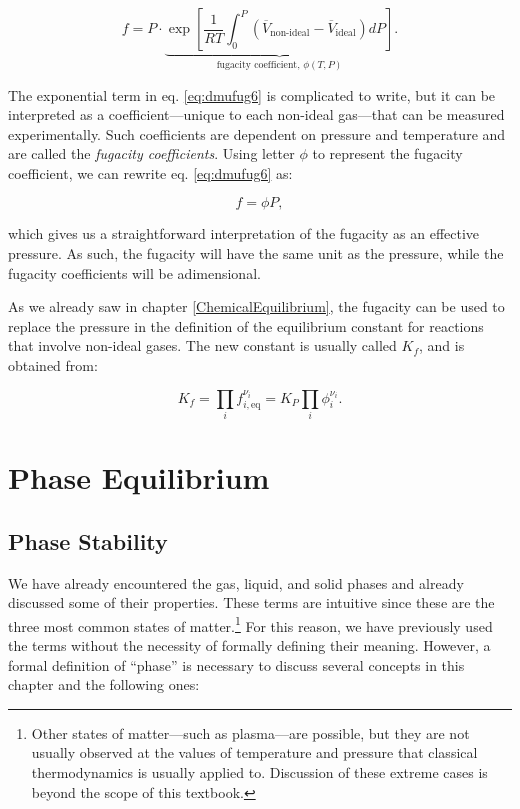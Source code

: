 \documentclass[
  9pt,
]{extbook}
\theoremstyle{definition}
\theoremstyle{definition}
\theoremstyle{definition}
\theoremstyle{remark}
\begin{document}
\begin{equation}
f = P \cdot \underbrace{\exp\left[ \frac{1}{RT} \int_0^P \left(\overline{V}_{\text{non-ideal}}-\overline{V}_{\text{ideal}} \right) dP \right]}_{\text{fugacity coefficient, }\phi(T,P)}.
\label{eq:dmufug6}
\end{equation}

The exponential term in eq. \eqref{eq:dmufug6} is complicated to write, but it can be interpreted as a coefficient---unique to each non-ideal gas---that can be measured experimentally. Such coefficients are dependent on pressure and temperature and are called the \emph{fugacity coefficients}. Using letter \(\phi\) to represent the fugacity coefficient, we can rewrite eq. \eqref{eq:dmufug6} as:

\begin{equation}
f = \phi P,
\label{eq:dmufug7}
\end{equation}

which gives us a straightforward interpretation of the fugacity as an effective pressure. As such, the fugacity will have the same unit as the pressure, while the fugacity coefficients will be adimensional.

As we already saw in chapter \ref{ChemicalEquilibrium}, the fugacity can be used to replace the pressure in the definition of the equilibrium constant for reactions that involve non-ideal gases. The new constant is usually called \(K_f\), and is obtained from:

\begin{equation}
K_f=\prod_i f_{i,\text{eq}}^{\nu_i} = K_P \prod_i \phi_{i}^{\nu_i}.
\label{eq:kfdef}
\end{equation}

\renewcommand*{\standardstate}{{-\kern-6pt{\ominus}\kern-6pt-}}

\hypertarget{PhaseEquilibrium}{%
\chapter{Phase Equilibrium}\label{PhaseEquilibrium}}

\hypertarget{phase-stability}{%
\section{Phase Stability}\label{phase-stability}}

We have already encountered the gas, liquid, and solid phases and already discussed some of their properties. These terms are intuitive since these are the three most common states of matter.\footnote{Other states of matter---such as plasma---are possible, but they are not usually observed at the values of temperature and pressure that classical thermodynamics is usually applied to. Discussion of these extreme cases is beyond the scope of this textbook.} For this reason, we have previously used the terms without the necessity of formally defining their meaning. However, a formal definition of ``phase'' is necessary to discuss several concepts in this chapter and the following ones:
\end{document}
